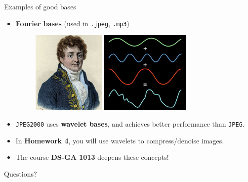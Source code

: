 \documentclass{beamer}
\begin{document}
\begin{frame}[t]{Examples of good bases}
	\begin{itemize}
		\item \textbf{Fourier bases} (used in \texttt{.jpeg}, \texttt{.mp3})
			\begin{figure}
				\includegraphics[height=4cm]{./fourier.jpeg}
				\hspace{1cm}
				\includegraphics[height=4cm]{./fourier_dec.jpg}
			\end{figure}

		\item \texttt{JPEG2000} uses \textbf{wavelet bases}, and achieves better performance than \texttt{JPEG}.
		\item In \textbf{Homework 4}, you will use wavelets to compress/denoise images.
		\item The course \textbf{DS-GA 1013} deepens these concepts!
	\end{itemize}
\end{frame}
\appendix
\backupbegin
\begin{frame}[t]{Questions?}
	\grid
	\pause
	\pause
	\pause
\end{frame}
\backupend
\end{document}
